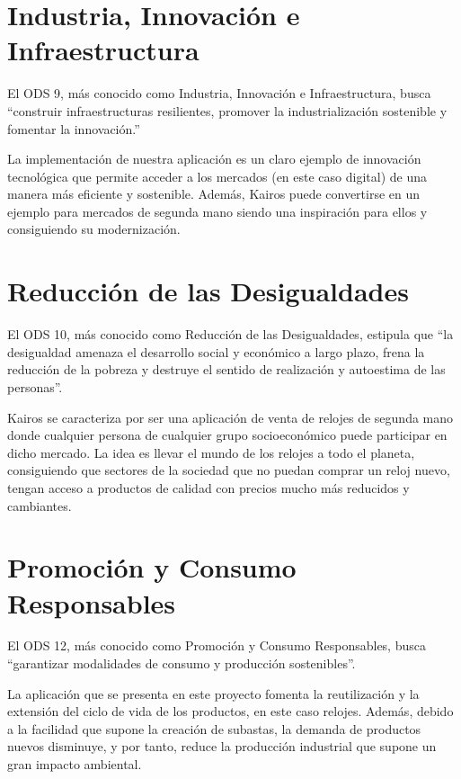 \section{Industria, Innovación e Infraestructura}

	El ODS 9, más conocido como Industria, Innovación e Infraestructura, busca ``construir infraestructuras resilientes, promover la industrialización sostenible y fomentar la innovación.''
	
	La implementación de nuestra aplicación es un claro ejemplo de innovación tecnológica que permite acceder a los mercados (en este caso digital) de una manera más eficiente y sostenible. Además, Kairos puede convertirse en un ejemplo para mercados de segunda mano siendo una inspiración para ellos y consiguiendo su modernización.
	

\section{Reducción de las Desigualdades}

	El ODS 10, más conocido como Reducción de las Desigualdades, estipula que ``la desigualdad amenaza el desarrollo social y económico a largo plazo, frena la reducción de la pobreza y destruye el sentido de realización y autoestima de las personas''.
	
	Kairos se caracteriza por ser una aplicación de venta de relojes de segunda mano donde cualquier persona de cualquier grupo socioeconómico puede participar en dicho mercado. La idea es llevar el mundo de los relojes a todo el planeta, consiguiendo que sectores de la sociedad que no puedan comprar un reloj nuevo, tengan acceso a productos de calidad con precios mucho más reducidos y cambiantes.

	
\section{Promoción y Consumo Responsables}

	El ODS 12, más conocido como Promoción y Consumo Responsables, busca ``garantizar modalidades de consumo y producción sostenibles''. 
	
	La aplicación que se presenta en este proyecto fomenta la reutilización y la extensión del ciclo de vida de los productos, en este caso relojes. Además, debido a la facilidad que supone la creación de subastas, la demanda de productos nuevos disminuye, y por tanto, reduce la producción industrial que supone un gran impacto ambiental.
	

